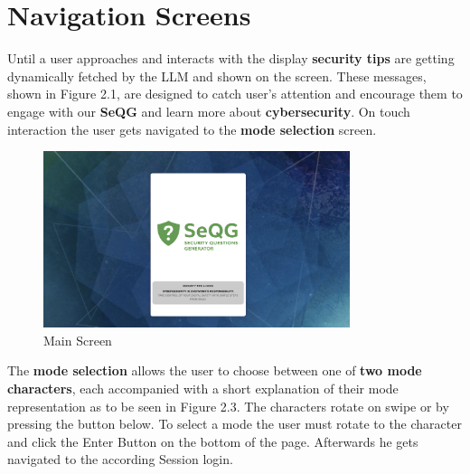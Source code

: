 \section{Navigation Screens}

Until a user approaches and interacts with the display \textbf{security tips} are getting dynamically fetched by the LLM and shown on the screen.
These messages, shown in Figure 2.1, are designed to catch user's attention and encourage them to engage with our \textbf{SeQG} and learn more about \textbf{cybersecurity}.
On touch interaction the user gets navigated to the \textbf{mode selection} screen.

\begin{figure}[H]
    \centering
    \includegraphics[width=0.8\textwidth]{images/MainScreen1.png}
    \caption{Main Screen}
\end{figure}

The \textbf{mode selection} allows the user to choose between one of \textbf{two mode characters}, each accompanied with a short explanation of their mode representation as to be seen in Figure 2.3. 
The characters rotate on swipe or by pressing the button below. 
To select a mode the user must rotate to the character and click the Enter Button on the bottom of the page. 
Afterwards he gets navigated to the according Session login.

